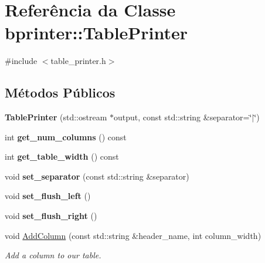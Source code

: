 \hypertarget{classbprinter_1_1TablePrinter}{}\section{Referência da Classe bprinter\+:\+:Table\+Printer}
\label{classbprinter_1_1TablePrinter}


{\ttfamily \#include $<$table\+\_\+printer.\+h$>$}

\subsection*{Métodos Públicos}
\begin{DoxyCompactItemize}
\item 
\mbox{\label{classbprinter_1_1TablePrinter_a1c0f1a6852f008b51f5894badc9bcd0d}} 
{\bfseries Table\+Printer} (std\+::ostream $\ast$output, const std\+::string \&separator=\char`\"{}$\vert$\char`\"{})
\item 
\mbox{\label{classbprinter_1_1TablePrinter_a45e8fb4a910a159e2acba9835b4528b8}} 
int {\bfseries get\+\_\+num\+\_\+columns} () const
\item 
\mbox{\label{classbprinter_1_1TablePrinter_a19e57b08aab4afe1131ba5d409b9b035}} 
int {\bfseries get\+\_\+table\+\_\+width} () const
\item 
\mbox{\label{classbprinter_1_1TablePrinter_addf91935927992b78c5f93c598561f20}} 
void {\bfseries set\+\_\+separator} (const std\+::string \&separator)
\item 
\mbox{\label{classbprinter_1_1TablePrinter_ad5375fd1ba9880895073c42e43df2c48}} 
void {\bfseries set\+\_\+flush\+\_\+left} ()
\item 
\mbox{\label{classbprinter_1_1TablePrinter_a7a7f06022ff96a3ef3e93c58feef4511}} 
void {\bfseries set\+\_\+flush\+\_\+right} ()
\item 
void \hyperlink{classbprinter_1_1TablePrinter_a271d4d46ec64e34f3b00093d0971101d}{Add\+Column} (const std\+::string \&header\+\_\+name, int column\+\_\+width)
\begin{DoxyCompactList}\small\item\em Add a column to our table. \end{DoxyCompactList}\item 

\end{DoxyCompactItemize}
